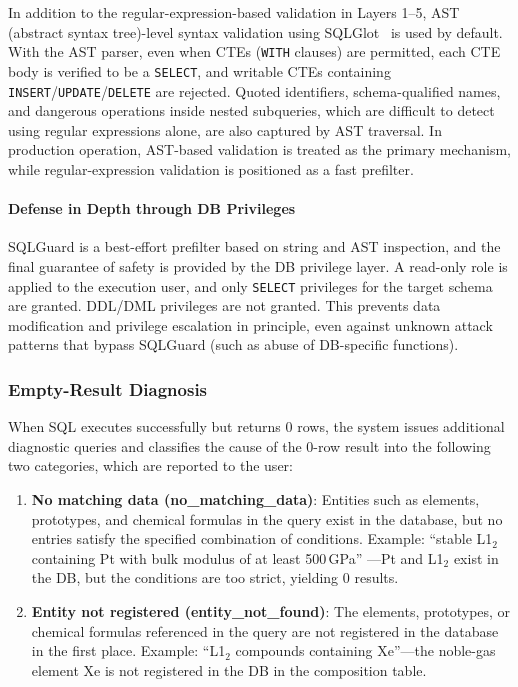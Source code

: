 \documentclass[5p,twocolumn]{elsarticle}
\begin{document}
In addition to the regular-expression-based validation in Layers 1--5,
AST (abstract syntax tree)-level syntax validation using SQLGlot~\citep{sqlglot2023}
is used by default.
With the AST parser, even when CTEs (\texttt{WITH} clauses) are permitted, each CTE body is verified to be
a \texttt{SELECT}, and writable CTEs containing \texttt{INSERT}/\texttt{UPDATE}/\texttt{DELETE}
are rejected.
Quoted identifiers, schema-qualified names, and dangerous operations inside nested subqueries,
which are difficult to detect using regular expressions alone, are also captured by AST traversal.
In production operation, AST-based validation is treated as the primary mechanism, while regular-expression validation is positioned as a fast prefilter.

\paragraph{Defense in Depth through DB Privileges}
SQLGuard is a best-effort prefilter based on string and AST inspection,
and the final guarantee of safety is provided by the DB privilege layer.
A read-only role is applied to the execution user, and only \texttt{SELECT} privileges for the target schema are granted.
DDL/DML privileges are not granted.
This prevents data modification and privilege escalation in principle, even against unknown attack patterns that bypass SQLGuard
(such as abuse of DB-specific functions).

\subsubsection{Empty-Result Diagnosis}
\label{sec:empty_diagnosis}

When SQL executes successfully but returns 0 rows,
the system issues additional diagnostic queries and
classifies the cause of the 0-row result into the following two categories, which are reported to the user:

\begin{enumerate}
  \item \textbf{No matching data (no\_matching\_data)}:
    Entities such as elements, prototypes, and chemical formulas in the query exist in the database,
    but no entries satisfy the specified combination of conditions.
    Example: ``stable L1$_2$ containing Pt with bulk modulus of at least 500\,GPa''
    ---Pt and L1$_2$ exist in the DB, but the conditions are too strict, yielding 0 results.
  \item \textbf{Entity not registered (entity\_not\_found)}:
    The elements, prototypes, or chemical formulas referenced in the query are not registered in the database in the first place.
    Example: ``L1$_2$ compounds containing Xe''---the noble-gas element Xe is not registered in the DB in the composition table.
\end{enumerate}
\end{document}
